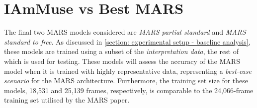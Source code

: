 \section{IAmMuse vs Best MARS}
\label{section: evaluation - iammuse vs best mars}

The final two MARS models considered are \textit{MARS partial standard} and \textit{MARS standard to free}.
As discussed in \cref{section: experimental setup - baseline analysis}, these models are trained using a subset of the \textit{interpretation data}, the rest of which is used for testing.
These models will assess the accuracy of the MARS model when it is trained with highly representative data, representing a \textit{best-case scenario} for the MARS architecture.
Furthermore, the training set size for these models, 18,531 and 25,139 frames, respectively, is comparable to the 24,066-frame training set utilised by the MARS paper.


